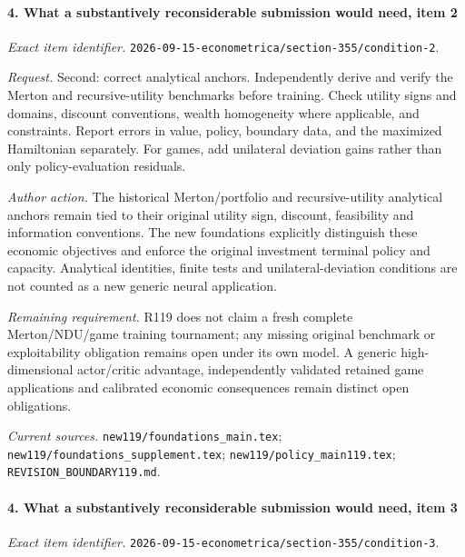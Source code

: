 \paragraph{4. What a substantively reconsiderable submission would need, item 2}

\emph{Exact item identifier.} \nolinkurl{2026-09-15-econometrica/section-355/condition-2}.

\par\emph{Request.} Second: correct analytical anchors. Independently derive and verify the Merton and recursive-utility benchmarks before training. Check utility signs and domains, discount conventions, wealth homogeneity where applicable, and constraints. Report errors in value, policy, boundary data, and the maximized Hamiltonian separately. For games, add unilateral deviation gains rather than only policy-evaluation residuals.

\par\emph{Author action.} The historical Merton/\allowbreak{}portfolio and recursive-utility analytical anchors remain tied to their original utility sign, discount, feasibility and information conventions. The new foundations explicitly distinguish these economic objectives and enforce the original investment terminal policy and capacity. Analytical identities, finite tests and unilateral-deviation conditions are not counted as a new generic neural application.

\par\emph{Remaining requirement.} R119 does not claim a fresh complete Merton/\allowbreak{}NDU/\allowbreak{}game training tournament; any missing original benchmark or exploitability obligation remains open under its own model. A generic high-dimensional actor/\allowbreak{}critic advantage, independently validated retained game applications and calibrated economic consequences remain distinct open obligations.

\par\emph{Current sources.} \nolinkurl{new119/foundations_main.tex}; \nolinkurl{new119/foundations_supplement.tex}; \nolinkurl{new119/policy_main119.tex}; \nolinkurl{REVISION_BOUNDARY119.md}.

\paragraph{4. What a substantively reconsiderable submission would need, item 3}

\emph{Exact item identifier.} \nolinkurl{2026-09-15-econometrica/section-355/condition-3}.

